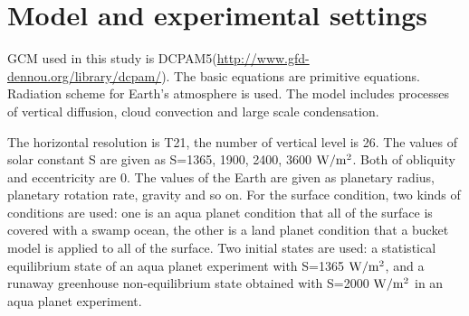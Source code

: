 \documentclass[dvipdfmx,twocolumn,10pt]{jsarticle}
\begin{document}
\section{Model and experimental settings}
\vspace{-0.5zh}
GCM used in this study is DCPAM5(\url{http://www.gfd-dennou.org/library/dcpam/}). 
The basic equations are primitive equations. 
Radiation scheme for Earth's atmosphere is used. 
The model includes processes of vertical diffusion, cloud convection and large scale condensation. 

The horizontal resolution is T21, the number of vertical level is 26. 
The values of solar constant S are given as S=1365, 1900, 2400, 3600 $\rm{W/m^{2}}$. 
Both of obliquity and eccentricity are 0. 
The values of the Earth are given as planetary radius, planetary rotation rate, gravity and so on. 
For the surface condition, two kinds of conditions are used:
one is an aqua planet condition that all of the surface is covered with a swamp ocean, 
the other is a land planet condition that a bucket model is applied to all of the surface. 
Two initial states are used:
a statistical equilibrium state of an aqua planet experiment with S=1365 $\rm{W/m^{2}}$, 
and a runaway greenhouse non-equilibrium state obtained with S=2000 $\rm{W/m^{2}}$ in an aqua planet experiment. 

\vspace{-0.2zh}
\end{document}
